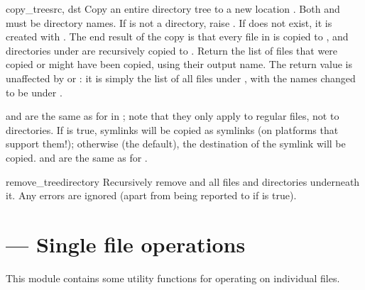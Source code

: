\documentclass{manual}
\begin{document}
\begin{funcdesc}{copy_tree}{src, dst}
Copy an entire directory tree  to a new location .  Both
 and  must be directory names.  If  is not a
directory, raise .  If  does 
not exist, it is created with .  The end result of the 
copy is that every file in  is copied to , and 
directories under  are recursively copied to .  
Return the list of files that were copied or might have been copied,
using their output name. The return value is unaffected by 
or : it is simply the list of all files under ,
with the names changed to be under .

 and  are the same as for
 in ;
note that they only apply to regular files, not to directories.  If
 is true, symlinks will be copied as symlinks
(on platforms that support them!); otherwise (the default), the
destination of the symlink will be copied.   and
 are the same as for
.
\end{funcdesc}

\begin{funcdesc}{remove_tree}{directory}
Recursively remove  and all files and directories underneath
it. Any errors are ignored (apart from being reported to  if
 is true).
\end{funcdesc}


\section{ --- Single file operations}

This module contains some utility functions for operating on individual files.
\end{document}
